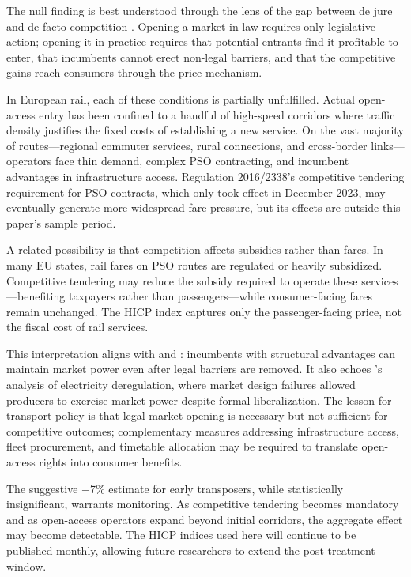 \documentclass[12pt]{article}
\begin{document}
The null finding is best understood through the lens of the gap between de jure and de facto competition \citep{djankov2002regulation}. Opening a market in law requires only legislative action; opening it in practice requires that potential entrants find it profitable to enter, that incumbents cannot erect non-legal barriers, and that the competitive gains reach consumers through the price mechanism.

In European rail, each of these conditions is partially unfulfilled. Actual open-access entry has been confined to a handful of high-speed corridors where traffic density justifies the fixed costs of establishing a new service. On the vast majority of routes---regional commuter services, rural connections, and cross-border links---operators face thin demand, complex PSO contracting, and incumbent advantages in infrastructure access. Regulation 2016/2338's competitive tendering requirement for PSO contracts, which only took effect in December 2023, may eventually generate more widespread fare pressure, but its effects are outside this paper's sample period.

A related possibility is that competition affects subsidies rather than fares. In many EU states, rail fares on PSO routes are regulated or heavily subsidized. Competitive tendering may reduce the subsidy required to operate these services---benefiting taxpayers rather than passengers---while consumer-facing fares remain unchanged. The HICP index captures only the passenger-facing price, not the fiscal cost of rail services.

This interpretation aligns with \citet{stigler1971theory} and \citet{peltzman1976toward}: incumbents with structural advantages can maintain market power even after legal barriers are removed. It also echoes \citet{borenstein2002trouble}'s analysis of electricity deregulation, where market design failures allowed producers to exercise market power despite formal liberalization. The lesson for transport policy is that legal market opening is necessary but not sufficient for competitive outcomes; complementary measures addressing infrastructure access, fleet procurement, and timetable allocation may be required to translate open-access rights into consumer benefits.

The suggestive $-$7\% estimate for early transposers, while statistically insignificant, warrants monitoring. As competitive tendering becomes mandatory and as open-access operators expand beyond initial corridors, the aggregate effect may become detectable. The HICP indices used here will continue to be published monthly, allowing future researchers to extend the post-treatment window.
\end{document}
